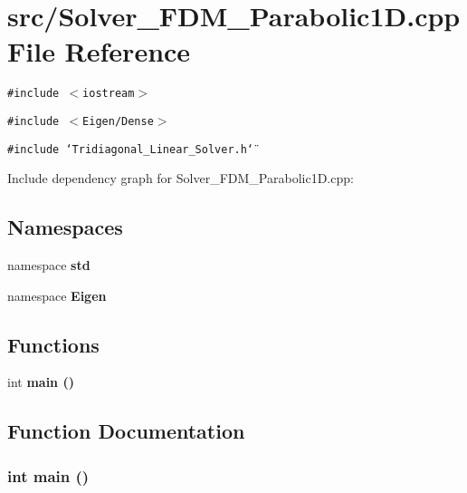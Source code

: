 \section{src/Solver\_\-FDM\_\-Parabolic1D.cpp File Reference}
\label{Solver__FDM__Parabolic1D_8cpp}
{\tt \#include $<$iostream$>$}\par
{\tt \#include $<$Eigen/Dense$>$}\par
{\tt \#include \char`\"{}Tridiagonal\_\-Linear\_\-Solver.h\char`\"{}}\par


Include dependency graph for Solver\_\-FDM\_\-Parabolic1D.cpp:\subsection*{Namespaces}
\begin{CompactItemize}
\item 
namespace \bf{std}
\item 
namespace \bf{Eigen}
\end{CompactItemize}
\subsection*{Functions}
\begin{CompactItemize}
\item 
int \bf{main} ()
\end{CompactItemize}


\subsection{Function Documentation}
\subsubsection{\setlength{\rightskip}{0pt plus 5cm}int main ()}\label{Solver__FDM__Parabolic1D_8cpp_e66f6b31b5ad750f1fe042a706a4e3d4}


